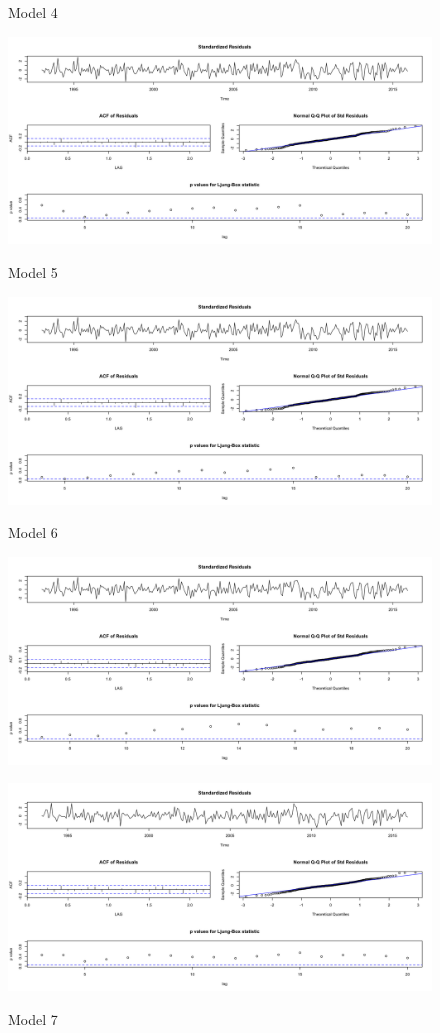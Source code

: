 \documentclass[twoside,twocolumn]{article}
\begin{document}
         \begin{figure}[H]
    	\centering
     	\caption{Model 4}
     	\includegraphics[width=\linewidth]{images/sarima4}
     	\label{fig:sarima4}
     	\caption{Model 5}
     	\includegraphics[width=\linewidth]{images/sarima5}
     	\label{fig:sarima5}
     	\caption{Model 6}
     	\includegraphics[width=\linewidth]{images/sarima6}
     	\label{fig:sarima6}
     	     	\caption{Model 7}
     	\includegraphics[width=\linewidth]{images/sarima7}
     	\label{fig:sarima7}
      \end{figure}
\end{document}
